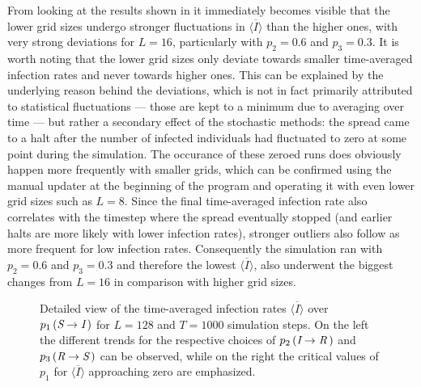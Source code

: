 From looking at the results shown in  it immediately becomes visible that the lower grid sizes undergo stronger fluctuations in $\overline{\langle I\rangle}$ than the higher ones, 
with very strong deviations for $L=16$, particularly with $p_2=0.6$ and $p_3=0.3$. It is worth noting that the lower grid sizes only deviate towards smaller time-averaged infection rates and never towards higher ones. 
This can be explained by the underlying reason behind the deviations, which is not in fact primarily attributed to statistical fluctuations --- those are kept to a minimum due to averaging over time --- but
rather a secondary effect of the stochastic methods: the spread came to a halt after the number of infected individuals had fluctuated to zero at some point during the simulation. The occurance of these zeroed runs does
obviously happen more frequently with smaller grids, which can be confirmed using the manual updater at the beginning of the program and operating it with even lower grid sizes such as $L=8$.
Since the final time-averaged infection rate also correlates with the timestep where the spread eventually stopped (and earlier halts are more likely with lower infection rates), stronger outliers also follow as more frequent 
for low infection rates. Consequently the simulation ran with $p_2=0.6$ and $p_3=0.3$ and therefore the lowest $\overline{\langle I\rangle}$, also underwent the biggest changes from $L=16$ in comparison with higher grid sizes.

\begin{figure}[ht]
    \centering
    \resizebox{\textwidth}{!}{}
    \caption{Detailed view of the time-averaged infection rates $\overline{\langle I\rangle}$ over $p_1\left(\textit{S}\rightarrow\textit{I}\,\right)$ for $L=128$ and $T=1000$ simulation steps. On the left the different
    trends for the respective choices of $p_2\left(\textit{I}\rightarrow\textit{R}\,\right)$ and $p_3\left(\textit{R}\rightarrow\textit{S}\,\right)$ can be observed, 
    while on the right the critical values of $p_1$ for $\overline{\langle I\rangle}$ approaching zero are emphasized.}\label{fig:res_dis_avg_inf_over_p1_L128}
\end{figure}

